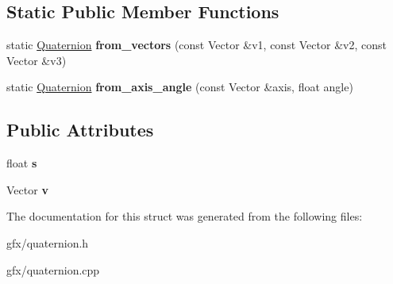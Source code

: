 \subsection*{Static Public Member Functions}
\begin{DoxyCompactItemize}
\item 
static \hyperlink{structQuaternion}{Quaternion} {\bfseries from\+\_\+vectors} (const Vector \&v1, const Vector \&v2, const Vector \&v3)\hypertarget{structQuaternion_a8fd5a5719606e30324dbe360e22f2b20}{}\label{structQuaternion_a8fd5a5719606e30324dbe360e22f2b20}

\item 
static \hyperlink{structQuaternion}{Quaternion} {\bfseries from\+\_\+axis\+\_\+angle} (const Vector \&axis, float angle)\hypertarget{structQuaternion_a16c26a93febc1527b67b29903071267d}{}\label{structQuaternion_a16c26a93febc1527b67b29903071267d}

\end{DoxyCompactItemize}
\subsection*{Public Attributes}
\begin{DoxyCompactItemize}
\item 
float {\bfseries s}\hypertarget{structQuaternion_afb7882818f7cff361b0596da0401074a}{}\label{structQuaternion_afb7882818f7cff361b0596da0401074a}

\item 
Vector {\bfseries v}\hypertarget{structQuaternion_ac536472483eb40090249d341758ac1ea}{}\label{structQuaternion_ac536472483eb40090249d341758ac1ea}

\end{DoxyCompactItemize}


The documentation for this struct was generated from the following files\+:\begin{DoxyCompactItemize}
\item 
gfx/quaternion.\+h\item 
gfx/quaternion.\+cpp\end{DoxyCompactItemize}
